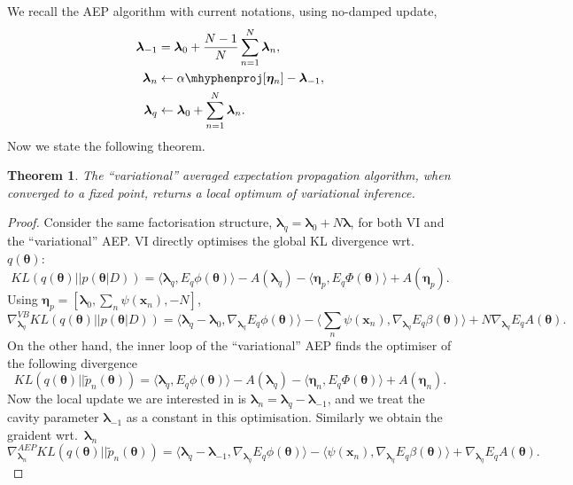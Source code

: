 \documentclass{article} %
\newtheorem{theorem}{Theorem}
\begin{document}
%
We recall the AEP algorithm with current notations, using no-damped update,
%
\begin{align}
\bm{\lambda}_{-1} & = \bm{\lambda}_0 + \frac{N-1}{N} \sum_{n=1}^N \bm{\lambda}_n, \\
\bm{\lambda}_n &\leftarrow \mathtt{\alpha \mhyphen proj}[\bm{\eta}_n] - \bm{\lambda}_{-1}, \\
\bm{\lambda}_q &\leftarrow \bm{\lambda}_0 + \sum_{n=1}^N \bm{\lambda}_n.
\end{align}
%
%
Now we state the following theorem. 
%
\begin{theorem}
The ``variational'' averaged expectation propagation algorithm, when converged to a fixed point, returns a local optimum of variational inference.
\end{theorem}
\begin{proof}
Consider the same factorisation structure, $\bm{\lambda}_q = \bm{\lambda}_0 + N \bm{\lambda}$, for both VI and the ``variational'' AEP. VI directly optimises the global KL divergence wrt.~$q(\bm{\theta})$:
\begin{equation}
KL(q(\bm{\theta}) || p(\bm{\theta} | D)) = \langle \bm{\lambda}_q, E_q \phi(\bm{\theta}) \rangle - A(\bm{\lambda}_q) - \langle \bm{\eta}_p, E_q \Phi(\bm{\theta}) \rangle + A(\bm{\eta}_p).
\end{equation}
Using $\bm{\eta}_p = [\bm{\lambda}_0, \sum_{n} \psi(\bm{x}_n), -N]$,
\begin{equation}
\nabla_{\bm{\lambda}_q}^{VB} KL(q(\bm{\theta}) || p(\bm{\theta} | D)) = \langle \bm{\lambda}_q - \bm{\lambda}_0, \nabla_{\bm{\lambda}_q} E_q \phi(\bm{\theta}) \rangle - \langle \sum_{n} \psi(\bm{x}_n), \nabla_{\bm{\lambda}_q} E_q \beta(\bm{\theta}) \rangle + N \nabla_{\bm{\lambda}_q} E_q A(\bm{\theta}).
\end{equation}
On the other hand, the inner loop of the ``variational'' AEP finds the optimiser of the following divergence
\begin{equation}
KL(q(\bm{\theta}) || \tilde{p}_n(\bm{\theta})) = \langle \bm{\lambda}_q, E_q \phi(\bm{\theta}) \rangle - A(\bm{\lambda}_q) - \langle \bm{\eta}_n, E_q \Phi(\bm{\theta}) \rangle + A(\bm{\eta}_n).
\end{equation}
Now the local update we are interested in is $\bm{\lambda}_n = \bm{\lambda}_q - \bm{\lambda}_{-1}$, and we treat the cavity parameter $\bm{\lambda}_{-1}$ as a constant in this optimisation. Similarly we obtain the graident wrt.~$\bm{\lambda}_n$
\begin{equation}
\nabla_{\bm{\lambda}_n}^{AEP} KL(q(\bm{\theta}) || \tilde{p}_n(\bm{\theta})) = \langle \bm{\lambda}_q - \bm{\lambda}_{-1}, \nabla_{\bm{\lambda}_q} E_q \phi(\bm{\theta}) \rangle - \langle \psi(\bm{x}_n), \nabla_{\bm{\lambda}_q} E_q \beta(\bm{\theta}) \rangle +  \nabla_{\bm{\lambda}_q} E_q A(\bm{\theta}).

\end{equation}
\end{proof}
\end{document}
